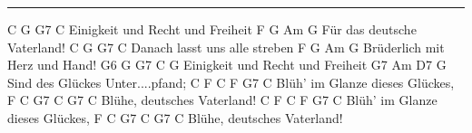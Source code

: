 \noindent\rule{\columnwidth}{1pt}

\begin{lstsong}
C          G   G7        C
Einigkeit und Recht und Freiheit
F                G Am G
Für das deutsche Vaterland!
C            G   G7    C
Danach lasst uns alle streben
F              G    Am  G
Brüderlich mit Herz und Hand!
G6    G       G7    C   G
Einigkeit und Recht und Freiheit
      G7 Am      D7       G
Sind des Glückes Unter....pfand;
C        F   C  F      G7   C
Blüh' im Glanze dieses Glückes,
F       C   G7    C  G7  C
Blühe, deutsches Vaterland!
C        F   C  F      G7   C
Blüh' im Glanze dieses Glückes,
F       C   G7    C  G7  C
Blühe, deutsches Vaterland!
\end{lstsong}
\newpage

